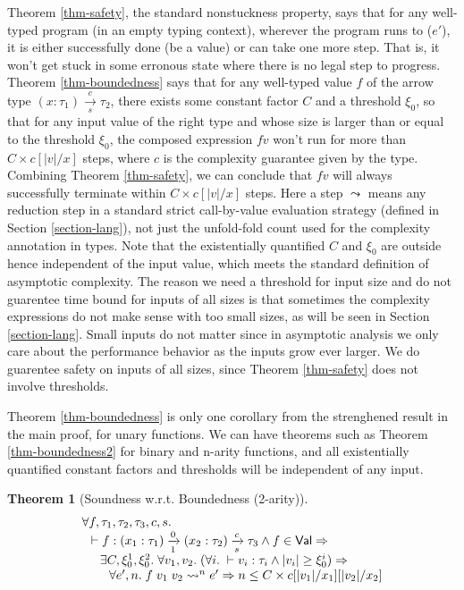 \documentclass[preprint]{sigplanconf}
\newcommand{\arrow}[4]{#1\xrightarrow[#3]{#2}#4}
\newtheorem{thm}{Theorem}
\begin{document}
Theorem \ref{thm-safety}, the standard nonstuckness property, says that for any well-typed program (in an empty typing context), wherever the program runs to ($e'$), it is either successfully done (be a value) or can take one more step. That is, it won't get stuck in some erronous state where there is no legal step to progress. Theorem \ref{thm-boundedness} says that for any well-typed value $f$ of the arrow type $\arrow{(x:\tau_1)}{c}{s}{\tau_2}$, there exists some constant factor $C$ and a threshold $\xi_0$, so that for any input value of the right type and whose size is larger than or equal to the threshold $\xi_0$, the composed expression $f v$ won't run for more than $C\times c[|v|/x]$ steps, where $c$ is the complexity guarantee given by the type. Combining Theorem \ref{thm-safety}, we can conclude that $f v$ will always successfully terminate within $C\times c[|v|/x]$ steps. Here a step $\leadsto$ means any reduction step in a standard strict call-by-value evaluation strategy (defined in Section \ref{section-lang}), not just the unfold-fold count used for the complexity annotation in types. Note that the existentially quantified $C$ and $\xi_0$ are outside hence independent of the input value, which meets the standard definition of asymptotic complexity. The reason we need a threshold for input size and do not guarentee time bound for inputs of all sizes is that sometimes the complexity expressions do not make sense with too small sizes, as will be seen in Section \ref{section-lang}. Small inputs do not matter since in asymptotic analysis we only care about the performance behavior as the inputs grow ever larger. We do guarentee safety on inputs of all sizes, since Theorem \ref{thm-safety} does not involve thresholds.

Theorem \ref{thm-boundedness} is only one corollary from the strenghened result in the main proof, for unary functions. We can have theorems such as Theorem \ref{thm-boundedness2} for binary and n-arity functions, and all existentially quantified constant factors and thresholds will be independent of any input.

\begin{thm}[\label{thm-boundedness2}Soundness w.r.t. Boundedness (2-arity)]
$$
\begin{array}{l}
\forall f,\tau_1,\tau_2,\tau_3,c,s. \\
\hspace{0.1in} \vdash f:\arrow{(x_1:\tau_1)}{0}{1}{\arrow{(x_2:\tau_2)}{c}{s}{\tau_3}} \wedge f\in\mathsf{Val}\Rightarrow \\
\hspace{0.2in} \exists C,\xi_0^1,\xi_0^2. \;\forall v_1,v_2.\; (\forall i.\;\vdash v_i:\tau_i \wedge |v_i| \geq \xi_0^i) \Rightarrow \\
\hspace{0.3in} \forall e',n.\; f\;v_1\;v_2\leadsto^n e' \Rightarrow n\leq C\times c[|v_1|/x_1][|v_2|/x_2]
\end{array}
$$
\end{thm}
\end{document}

